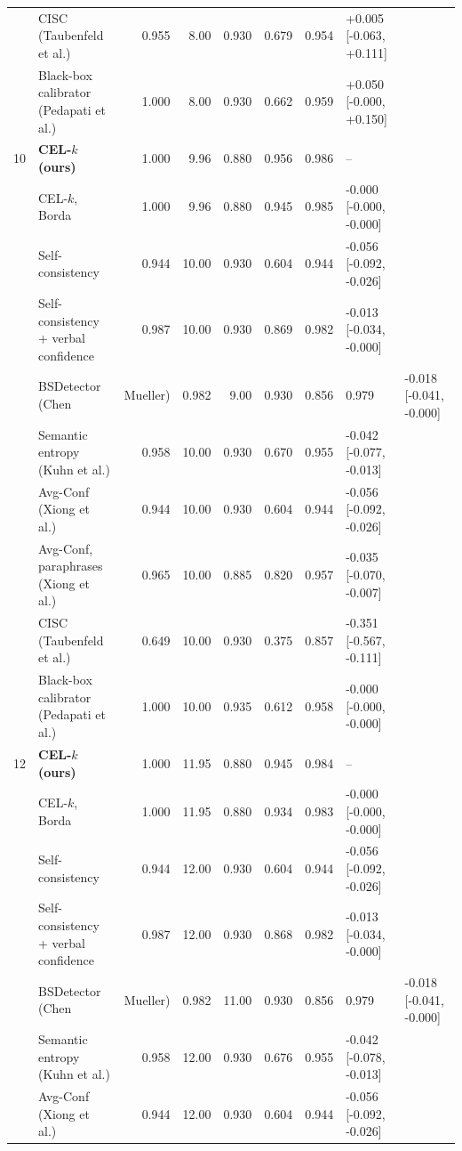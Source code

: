 \begin{table}[t]
\begin{tabular}{llrrrrrl}
 & CISC (Taubenfeld et al.) & 0.955 & 8.00 & 0.930 & 0.679 & 0.954 & +0.005 [-0.063, +0.111] \\
 & Black-box calibrator (Pedapati et al.) & 1.000 & 8.00 & 0.930 & 0.662 & 0.959 & +0.050 [-0.000, +0.150] \\
10 & \textbf{CEL-$k$ (ours)} & 1.000 & 9.96 & 0.880 & 0.956 & 0.986 & -- \\
 & \quad CEL-$k$, Borda & 1.000 & 9.96 & 0.880 & 0.945 & 0.985 & -0.000 [-0.000, -0.000] \\
 & Self-consistency & 0.944 & 10.00 & 0.930 & 0.604 & 0.944 & -0.056 [-0.092, -0.026] \\
 & Self-consistency + verbal confidence & 0.987 & 10.00 & 0.930 & 0.869 & 0.982 & -0.013 [-0.034, -0.000] \\
 & BSDetector (Chen & Mueller) & 0.982 & 9.00 & 0.930 & 0.856 & 0.979 & -0.018 [-0.041, -0.000] \\
 & Semantic entropy (Kuhn et al.) & 0.958 & 10.00 & 0.930 & 0.670 & 0.955 & -0.042 [-0.077, -0.013] \\
 & Avg-Conf (Xiong et al.) & 0.944 & 10.00 & 0.930 & 0.604 & 0.944 & -0.056 [-0.092, -0.026] \\
 & Avg-Conf, paraphrases (Xiong et al.) & 0.965 & 10.00 & 0.885 & 0.820 & 0.957 & -0.035 [-0.070, -0.007] \\
 & CISC (Taubenfeld et al.) & 0.649 & 10.00 & 0.930 & 0.375 & 0.857 & -0.351 [-0.567, -0.111] \\
 & Black-box calibrator (Pedapati et al.) & 1.000 & 10.00 & 0.935 & 0.612 & 0.958 & -0.000 [-0.000, -0.000] \\
12 & \textbf{CEL-$k$ (ours)} & 1.000 & 11.95 & 0.880 & 0.945 & 0.984 & -- \\
 & \quad CEL-$k$, Borda & 1.000 & 11.95 & 0.880 & 0.934 & 0.983 & -0.000 [-0.000, -0.000] \\
 & Self-consistency & 0.944 & 12.00 & 0.930 & 0.604 & 0.944 & -0.056 [-0.092, -0.026] \\
 & Self-consistency + verbal confidence & 0.987 & 12.00 & 0.930 & 0.868 & 0.982 & -0.013 [-0.034, -0.000] \\
 & BSDetector (Chen & Mueller) & 0.982 & 11.00 & 0.930 & 0.856 & 0.979 & -0.018 [-0.041, -0.000] \\
 & Semantic entropy (Kuhn et al.) & 0.958 & 12.00 & 0.930 & 0.676 & 0.955 & -0.042 [-0.078, -0.013] \\
 & Avg-Conf (Xiong et al.) & 0.944 & 12.00 & 0.930 & 0.604 & 0.944 & -0.056 [-0.092, -0.026] \\

\end{tabular}
\end{table}
